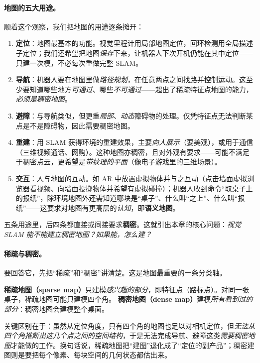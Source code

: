 \paragraph{地图的五大用途。}
顺着这个观察，我们把地图的用途逐条摊开\cite{gaoxiang2019slam14}：
\begin{enumerate}
  \item \textbf{定位}：地图最基本的功能。视觉里程计用局部地图定位，回环检测用全局描述子定位；我们还希望把地图\emph{保存}下来，让机器人下次开机仍能在其中定位——只建一次模，不必每次重做完整 SLAM。
  \item \textbf{导航}：机器人要在地图里做\emph{路径规划}，在任意两点之间找路并控制运动。这至少要知道哪些地方\emph{可通过}、哪些\emph{不可通过}——超出了稀疏特征点地图的能力，\emph{必须是稠密地图}。
  \item \textbf{避障}：与导航类似，但更重\emph{局部、动态}障碍物的处理。仅凭特征点无法判断某点是不是障碍物，因此需要稠密地图。
  \item \textbf{重建}：用 SLAM 获得环境的重建效果，主要\emph{向人展示}（要美观），或用于通信（三维视频通话、网购）。这种地图亦稠密，且对外观有要求——可能不满足于稠密点云，更希望是\emph{带纹理的平面}（像电子游戏里的三维场景）。
  \item \textbf{交互}：人与地图的互动。如 AR 中放置虚拟物体并与之互动（点击墙面虚拟浏览器看视频、向墙面投掷物体并希望有虚拟碰撞）；机器人收到命令“取桌子上的报纸”，除环境地图外还需知道哪块是“桌子”、什么叫“之上”、什么叫“报纸”——这要求对地图有更高层的\emph{认知}，即\textbf{语义地图}。
\end{enumerate}
五条用途里，后四条都直接或间接要求\textbf{稠密}。这就引出本章的核心问题：\emph{视觉 SLAM 能不能建立稠密地图？如果能，怎么建？}

\paragraph{稀疏与稠密。}
要回答它，先把“稀疏”和“稠密”讲清楚。这是地图最重要的一条分类轴。

\begin{definition}[稀疏地图与稠密地图]\label{def:dense-sparse-dense}
\textbf{稀疏地图（sparse map）}只建模\emph{感兴趣的部分}，即特征点（路标点）。对同一张桌子，稀疏地图可能只建模四个角。
\textbf{稠密地图（dense map）}建模\emph{所有看到过的部分}：稠密地图会建模整个桌面。
\end{definition}

关键区别在于：虽然从定位角度，只有四个角的地图也足以对相机定位，但\emph{无法从四个角推断出这几个点之间的空间结构}，于是无法完成导航、避障这类\emph{需要稠密地图}才能做的工作\cite{gaoxiang2019slam14}。换句话说，稀疏地图把“建图”退化成了“定位的副产品”；稠密建图则是要把每个像素、每块空间的几何状态都估出来。

